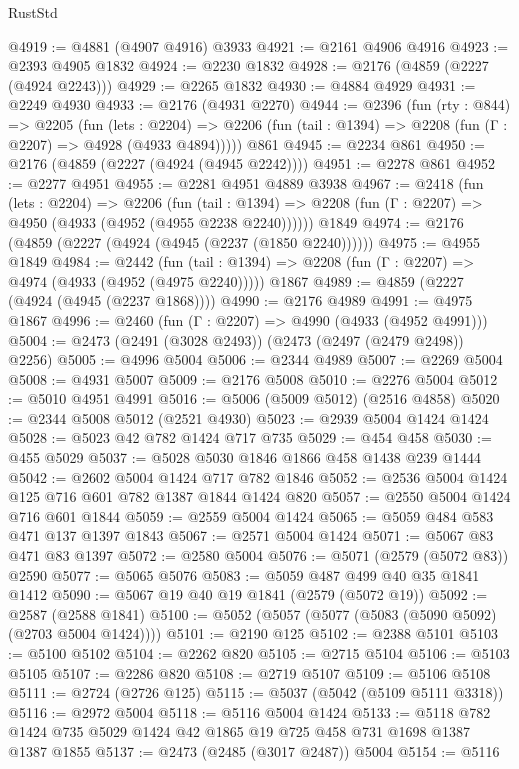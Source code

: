 \begin{lexlean}{RustStd}
\begin{coremodule}
{\begin{coremodule}
{{{{{{{{{{@4919 := @4881 (@4907 @4916) @3933
@4921 := @2161 @4906 @4916
@4923 := @2393 @4905 @1832
@4924 := @2230 @1832
@4928 := @2176 (@4859 (@2227 (@4924 @2243)))
@4929 := @2265 @1832
@4930 := @4884 @4929
@4931 := @2249 @4930
@4933 := @2176 (@4931 @2270)
@4944 := @2396
    (fun (rty : @844) =>
    @2205
      (fun (lets : @2204) =>
      @2206 (fun (tail : @1394) => @2208 (fun (Γ : @2207) => @4928 (@4933 @4894)))))
    @861
@4945 := @2234 @861
@4950 := @2176 (@4859 (@2227 (@4924 (@4945 @2242))))
@4951 := @2278 @861
@4952 := @2277 @4951
@4955 := @2281 @4951 @4889 @3938
@4967 := @2418
    (fun (lets : @2204) =>
    @2206
      (fun (tail : @1394) => @2208 (fun (Γ : @2207) => @4950 (@4933 (@4952 (@4955 @2238 @2240))))))
    @1849
@4974 := @2176 (@4859 (@2227 (@4924 (@4945 (@2237 (@1850 @2240))))))
@4975 := @4955 @1849
@4984 := @2442
    (fun (tail : @1394) => @2208 (fun (Γ : @2207) => @4974 (@4933 (@4952 (@4975 @2240)))))
    @1867
@4989 := @4859 (@2227 (@4924 (@4945 (@2237 @1868))))
@4990 := @2176 @4989
@4991 := @4975 @1867
@4996 := @2460 (fun (Γ : @2207) => @4990 (@4933 (@4952 @4991)))
@5004 := @2473 (@2491 (@3028 @2493)) (@2473 (@2497 (@2479 @2498)) @2256)
@5005 := @4996 @5004
@5006 := @2344 @4989
@5007 := @2269 @5004
@5008 := @4931 @5007
@5009 := @2176 @5008
@5010 := @2276 @5004
@5012 := @5010 @4951 @4991
@5016 := @5006 (@5009 @5012) (@2516 @4858)
@5020 := @2344 @5008 @5012 (@2521 @4930)
@5023 := @2939 @5004 @1424 @1424
@5028 := @5023 @42 @782 @1424 @717 @735
@5029 := @454 @458
@5030 := @455 @5029
@5037 := @5028 @5030 @1846 @1866 @458 @1438 @239 @1444
@5042 := @2602 @5004 @1424 @717 @782 @1846
@5052 := @2536 @5004 @1424 @125 @716 @601 @782 @1387 @1844 @1424 @820
@5057 := @2550 @5004 @1424 @716 @601 @1844
@5059 := @2559 @5004 @1424
@5065 := @5059 @484 @583 @471 @137 @1397 @1843
@5067 := @2571 @5004 @1424
@5071 := @5067 @83 @471 @83 @1397
@5072 := @2580 @5004
@5076 := @5071 (@2579 (@5072 @83)) @2590
@5077 := @5065 @5076
@5083 := @5059 @487 @499 @40 @35 @1841 @1412
@5090 := @5067 @19 @40 @19 @1841 (@2579 (@5072 @19))
@5092 := @2587 (@2588 @1841)
@5100 := @5052 (@5057 (@5077 (@5083 (@5090 @5092) (@2703 @5004 @1424))))
@5101 := @2190 @125
@5102 := @2388 @5101
@5103 := @5100 @5102
@5104 := @2262 @820
@5105 := @2715 @5104
@5106 := @5103 @5105
@5107 := @2286 @820
@5108 := @2719 @5107
@5109 := @5106 @5108
@5111 := @2724 (@2726 @125)
@5115 := @5037 (@5042 (@5109 @5111 @3318))
@5116 := @2972 @5004
@5118 := @5116 @5004 @1424
@5133 := @5118 @782 @1424 @735 @5029 @1424 @42 @1865 @19 @725 @458 @731 @1698 @1387 @1387 @1855
@5137 := @2473 (@2485 (@3017 @2487)) @5004
@5154 := @5116
}}}}}}}}}}
\end{coremodule}}
\end{coremodule}
\end{lexlean}

